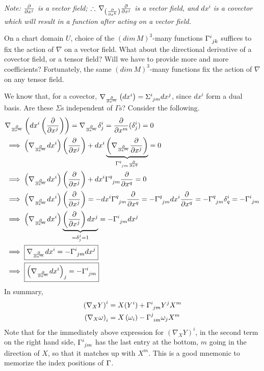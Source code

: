 \textit{Note: $\frac{\partial }{\partial x^j}$ is a vector field; $\therefore\,\nabla_{\left(\frac{\partial }{\partial x^k}\right)} \frac{\partial }{\partial x^j}$ is a vector field, and $dx^i$ is a covector which will result in a function after acting on a vector field.}

On a chart domain $U$, choice of the $(dim\,M)^3$-many functions $\ccf{i}{jk}$ suffices to fix the action of $\nabla$ on a vector field. What about the directional derivative of a covector field, or a tensor field? Will we have to provide more and more coefficients? Fortunately, the same $(dim\,M)^3$-many functions fix the action of $\nabla$ on any tensor field.

We know that, for a covector, $\nabla_{\cibasis{x^m}}\left(dx^i\right) = \Sigma\indices{^{i}_{jm}} dx^j$, since $dx^i$ form a dual basis. Are these $\Sigma$s independent of $\Gamma$s? Consider the following.
\begin{align*}
& \displaystyle\nabla_{\cibasis{x^m}} \left(dx^i \left(\cibasis{x^j}\right)\right) = \nabla_{\cibasis{x^m}} \delta^i_j = \cibasis{x^m}(\delta^i_j) = 0 \\
& \implies \displaystyle\left(\nabla_{\cibasis{x^m}} dx^i \right)\left(\cibasis{x^j}\right) + dx^i \underbrace{\left(\nabla_{\cibasis{x^m}} \cibasis{x^j}\right)}_{\ccf{q}{jm}\cibasis{x^q}} = 0 \\
& \implies \displaystyle\left(\nabla_{\cibasis{x^m}} dx^i \right)\left(\cibasis{x^j}\right) + dx^i \ccf{q}{jm} \cibasis{x^q} = 0 \\
& \implies \left(\nabla_{\cibasis{x^m}} dx^i \right)\left(\cibasis{x^j}\right) = - dx^i \ccf{q}{jm} \cibasis{x^q} = - \ccf{q}{jm} dx^i \cibasis{x^q} = - \ccf{q}{jm} \delta^i_q = - \ccf{i}{jm} \\
& \implies \left(\nabla_{\cibasis{x^m}} dx^i \right)\underbrace{\left(\cibasis{x^j}\right) dx^j}_{= \delta^j_j = 1} = -\ccf{i}{jm} dx^j \\
& \implies \boxed{\nabla_{\cibasis{x^m}} dx^i = -\ccf{i}{jm} dx^j} \\
& \implies \boxed{\left(\nabla_{\cibasis{x^m}} dx^i\right)_j = -\ccf{i}{jm}}
\end{align*}
In summary,
\begin{align}
  \displaystyle\left(\nabla_X Y\right)^i & = X(Y^i) + \ccf{i}{jm} Y^j X^m \\
  \displaystyle\left(\nabla_X \omega\right)_i & = X\left(\omega_i\right) - \ccf{j}{im} \omega_j X^m
\end{align}
Note that for the immediately above expression for $(\nabla_X Y)^i$, in the second term on the right hand side, $\ccf{i}{jm}$ has the last entry at the bottom, $m$ going in the direction of $X$, so that it matches up with $X^m$. This is a good mnemonic to memorize the index positions of $\ccf{}{}$.

